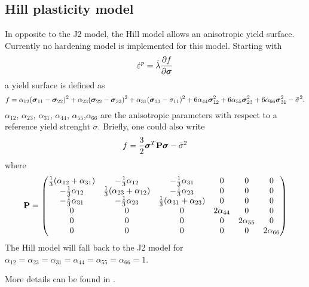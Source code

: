 \subsection*{Hill plasticity model}
In opposite to the J2 model, the Hill model allows an anisotropic yield surface. Currently no hardening model is implemented for this model.
Starting with
\begin{equation*}
\dot{\varepsilon}^p = \dot{\lambda}\frac{\partial f}{\partial \mbox{\boldmath $\sigma$}}
\end{equation*}
a yield surface is defined as
\begin{equation*}
f = \alpha_{12}(\mbox{\boldmath $\sigma$}_{11} - \mbox{\boldmath $\sigma$}_{22})^2 + \alpha_{23}(\mbox{\boldmath $\sigma$}_{22}-\mbox{\boldmath $\sigma$}_{33})^2 + \alpha_{31} (\mbox{\boldmath $\sigma$}_{33} - \sigma_{11})^2 + 6\alpha_{44}\mbox{\boldmath $\sigma$}_{12}^2+6\alpha_{55}\mbox{\boldmath $\sigma$}_{23}^2+6\alpha_{66}\mbox{\boldmath $\sigma$}_{31}^2
-\bar{\sigma}^2.
\end{equation*}
$\alpha_{12}$, $\alpha_{23}$, $\alpha_{31}$, $\alpha_{44}$, $\alpha_{55}$,$\alpha_{66}$ are the anisotropic parameters with respect to a reference yield strenght $\bar{\sigma}$. Briefly, one could also write
\begin{equation*}
f = \frac{3}{2}\mbox{\boldmath $\sigma$}^T  \mathbf{P} \mbox{\boldmath $\sigma$} - \bar{\sigma}^2
\end{equation*}
where
\begin{equation*}
\mathbf{P} = 
\begin{pmatrix}
\frac{1}{3}(\alpha_{12}+\alpha_{31}) & -\frac{1}{3}\alpha_{12} & -\frac{1}{3}\alpha_{31} & 0 & 0 & 0 \\
-\frac{1}{3}\alpha_{12} & \frac{1}{3}(\alpha_{23}+\alpha_{12}) & -\frac{1}{3}\alpha_{23} & 0 & 0 & 0 \\
-\frac{1}{3}\alpha_{31} & -\frac{1}{3}\alpha_{23} & \frac{1}{3}(\alpha_{31}+\alpha_{23}) & 0 & 0 & 0 \\
0 & 0 & 0 & 2\alpha_{44} & 0 & 0 \\
0 & 0 & 0 & 0 & 2\alpha_{55} & 0 \\
0 & 0 & 0 & 0 & 0 & 2\alpha_{66} \\
\end{pmatrix}
\end{equation*}
The Hill model will fall back to the J2 model for $\alpha_{12} = \alpha_{23} = \alpha_{31} = \alpha_{44} = \alpha_{55} = \alpha_{66} = 1$.

More details can be found in .

